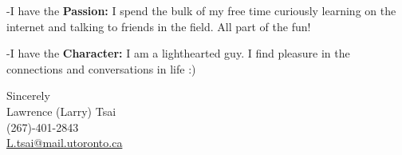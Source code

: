 \documentclass[11pt,a4]{article}
\newcommand{\bold}[1]{ {\bfseries #1}}
\begin{document}
-I have the \bold{Passion:} I spend the bulk of my free time curiously learning 
on the internet and talking to friends in the field. All part of the fun!\par
-I have the \bold{Character:} I am a lighthearted guy. I find pleasure in the
 connections and conversations in life  :)





\vspace{0.5cm}
\raggedright
Sincerely \\ Lawrence (Larry) Tsai \\ (267)-401-2843 \\ \href{mailto:L.tsai@mail.utoronto.ca}{L.tsai@mail.utoronto.ca}
\end{document}
